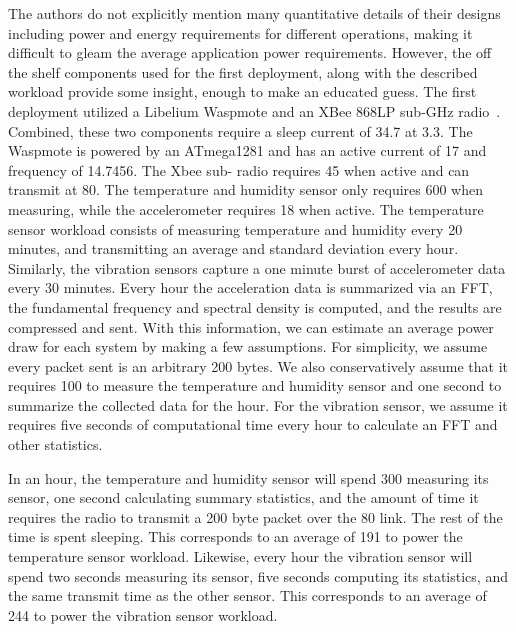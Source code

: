 The authors do not explicitly mention many quantitative details of their designs including power and energy requirements for different operations, making it difficult to gleam the average application power requirements.
However, the off the shelf components used for the first deployment, along with the described workload provide some insight, enough to make an educated guess.
The first deployment utilized a Libelium Waspmote and an XBee 868LP sub-\si{\giga\hertz} radio~\cite{waspmote,xbeeradio}.
Combined, these two components require a sleep current of 34.7\ssi{\micro\ampere} at 3.3\ssi{\volt}.
The Waspmote is powered by an ATmega1281 and has an active current of 17\ssi{\milli\ampere} and frequency of 14.7456\ssi{\mega\hertz}.
The Xbee sub-\ssi{\giga\hertz} radio requires 45\ssi{\milli\ampere} when active and can transmit at 80\ssi[per-mode=symbol]{\kilo\bit\per\second}.
The temperature and humidity sensor only requires 600\ssi{\micro\ampere} when measuring, while the accelerometer requires 18\ssi{\milli\ampere} when active.
The temperature sensor workload consists of measuring temperature and humidity every 20 minutes, and transmitting an average and standard deviation every hour.
Similarly, the vibration sensors capture a one minute burst of accelerometer data every 30 minutes.
Every hour the acceleration data is summarized via an FFT, the fundamental frequency and spectral density is computed, and the results are compressed and sent.
With this information, we can estimate an average power draw for each system by making a few assumptions.
For simplicity, we assume every packet sent is an arbitrary 200 bytes. We also conservatively assume that it requires 100\ssi{\milli\second} to measure the temperature and humidity sensor and one second to summarize the collected data for the hour. For the vibration sensor, we assume it requires five seconds of computational time every hour to calculate an FFT and other statistics.

In an hour, the temperature and humidity sensor will spend 300\ssi{\milli\second} measuring its sensor, one second calculating summary statistics, and the amount of time it requires the radio to transmit a 200 byte packet over the 80\ssi[per-mode=symbol]{\kilo\bit\per\second} link.
The rest of the time is spent sleeping.
This corresponds to an average of 191\ssi{\micro\watt} to power the temperature sensor workload.
Likewise, every hour the vibration sensor will spend two seconds measuring its sensor, five seconds computing its statistics, and the same transmit time as the other sensor.
This corresponds to an average of  244\ssi{\micro\watt} to power the vibration sensor workload.

